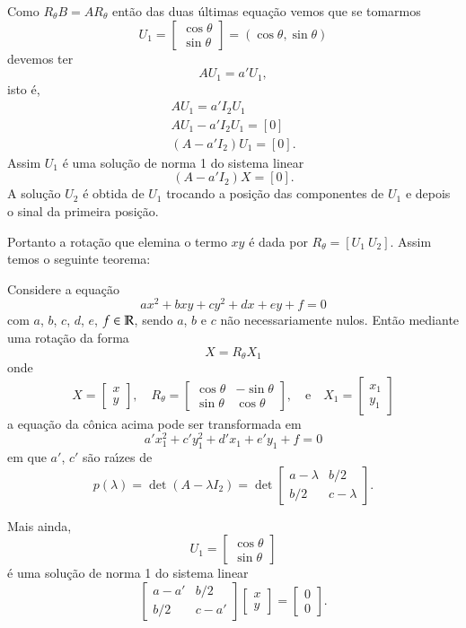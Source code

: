 Como $R_\theta B = AR_\theta$ ent\~ao das duas \'ultimas equa\c{c}\~ao vemos que se tomarmos
\[
  U_1 = \begin{bmatrix}
    \cos\theta\\
    \sin\theta
  \end{bmatrix} = (\cos\theta, \sin\theta)
\]
devemos ter
\[
  AU_1 = a'U_1,
\]
isto \'e,
\begin{align*}
  AU_1 = a'I_2 U_1\\
  AU_1 - a'I_2 U_1 = [0]\\
  (A - a'I_2)U_1 = [0].
\end{align*}
Assim $U_1$ \'e uma solu\c{c}\~ao de norma 1 do sistema linear
\[
  (A - a'I_2)X = [0].
\]
A solu\c{c}\~ao $U_2$ \'e obtida de $U_1$ trocando a posi\c{c}\~ao das componentes de $U_1$ e depois o sinal da primeira posi\c{c}\~ao.

Portanto a rota\c{c}\~ao que elemina o termo $xy$ \'e dada por $R_\theta = [U_1\ U_2]$. Assim temos o seguinte teorema:

\begin{teorema}
  Considere a equa\c{c}\~ao
  \[
      ax^2 + bxy + cy^2 + dx + ey + f = 0
  \]
  com $a$, $b$, $c$, $d$, $e$, $f \in \mathbb{R}$, sendo $a$, $b$ e $c$ n\~ao necessariamente nulos. Ent\~ao mediante uma rota\c{c}\~ao da forma
  \[
    X = R_\theta X_1
  \]
  onde
  \[
    X = \begin{bmatrix}
      x\\y
    \end{bmatrix}, \quad
    R_\theta = \begin{bmatrix}
    \cos\theta & -\sin\theta\\
    \sin\theta & \cos\theta
  \end{bmatrix}, \quad\mbox{e}\quad
  X_1 = \begin{bmatrix}
    x_1\\y_1
  \end{bmatrix}
  \]
  a equa\c{c}\~ao da c\^onica acima pode ser transformada em
  \[
    a'x_1^2 + c'y_1^2 + d'x_1 + e'y_1 + f = 0
  \]
  em que $a'$, $c'$ s\~ao ra{\'\i}zes de
  \[
    p(\lambda) = \det(A - \lambda I_2) = \det \begin{bmatrix}
      a - \lambda & b/2\\
      b/2 & c - \lambda
    \end{bmatrix}.
  \]

  Mais ainda,
  \[
    U_1 = \begin{bmatrix}
      \cos\theta\\ \sin\theta
    \end{bmatrix}
  \]
  \'e uma solu\c{c}\~ao de norma 1 do sistema linear
  \[
    \begin{bmatrix}
      a - a' & b/2\\
      b/2 & c - a'
    \end{bmatrix} \begin{bmatrix}
      x\\y
    \end{bmatrix} = \begin{bmatrix}
      0\\0
    \end{bmatrix}.
  \]
\end{teorema}


